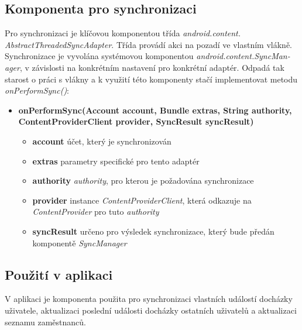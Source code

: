 \documentclass{diplomka}
\begin{document}
\subsection{Komponenta pro synchronizaci}
Pro synchronizaci je klíčovou komponentou třída \emph{android.content.\\AbstractThreadedSyncAdapter}. Třída provádí akci na pozadí ve vlastním vlákně. Synchronizace je vyvolána systémovou komponentou \emph{android.content.SyncMan-ager}, v závislosti na konkrétním nastavení pro konkrétní adaptér. Odpadá tak starost o práci s vlákny a k využití této komponenty stačí implementovat metodu \emph{onPerformSync()}:
\begin{itemize}[]
\item \textbf{onPerformSync(Account account, Bundle extras, String authority, ContentProviderClient provider, SyncResult syncResult)}
\begin{itemize}[]
\item  \textbf{account} účet, který je synchronizován
\item  \textbf{extras} parametry specifické pro tento adaptér
\item  \textbf{authority} \emph{authority}, pro kterou je požadována synchronizace
\item  \textbf{provider} instance \emph{ContentProviderClient}, která odkazuje na \emph{ContentProvider} pro tuto \emph{authority}
\item  \textbf{syncResult} určeno pro výsledek synchronizace, který bude předán komponentě \emph{SyncManager}
\end{itemize}
\end{itemize}

\subsection*{Použití v aplikaci}
V aplikaci je komponenta použita pro synchronizaci vlastních událostí docházky uživatele, aktualizaci poslední události docházky ostatních uživatelů a aktualizaci seznamu zaměstnanců.
\end{document}
